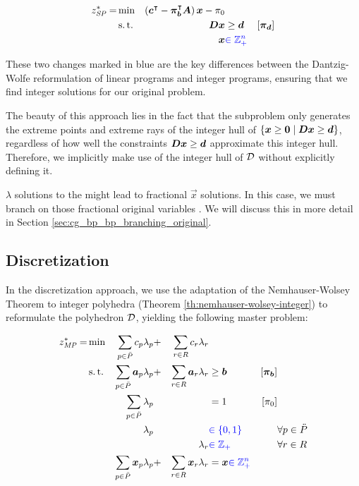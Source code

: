 \begin{equation}
\begin{aligned}
z^*_\SP{} = &\min & \left( \vec{c}\transpose - \vec{\pi}_\vec{b}\transpose \mat{A} \right) \vec{x} - \pi_0 & & \\
&\st & \mat{D} \vec{x} & \geq \vec{d} & \left[\vec{\pi}_\vec{d}\right] \\
&& \vec{x} & {\color{blue} \in \mathbb{Z}_+^n}
\end{aligned}
\end{equation}

These two changes marked in blue are the key differences between the Dantzig-Wolfe reformulation of linear programs and integer programs, ensuring that we find integer solutions for our original problem.

The beauty of this approach lies in the fact that the subproblem only generates the extreme points and extreme rays of the integer hull of $\{{\bm{x}} \geq {\bm{0}} \mid {\bm{D}} {\bm{x}} \geq {\bm{d}}\}$, regardless of how well the constraints ${\bm{D}} {\bm{x}} \geq {\bm{d}}$ approximate this integer hull. Therefore, we implicitly make use of the integer hull of $\mathcal{D}$ without explicitly defining it.

$\lambda$ solutions to the \MP{} might lead to fractional $\vec{x}$ solutions. In this case, we must branch on those fractional original variables \cite{thebook}. We will discuss this in more detail in Section \ref{sec:cg_bp_bp_branching_original}.

\subsection{Discretization}\label{sec:cg_bp_ip_discretization}
In the discretization approach, we use the adaptation of the Nemhauser-Wolsey Theorem to integer polyhedra (Theorem \ref{th:nemhauser-wolsey-integer}) to reformulate the polyhedron $\mathcal{D}$, yielding the following master problem:

\begin{equation}
\begin{aligned}
z^*_{\textit{MP}}{} = &\min & \sum_{p \in \ddot{P}} c_p \lambda_p &+ &\sum_{r \in R} c_r \lambda_r & & & \\
&\operatorname{s.t.} & \sum_{p \in \ddot{P}} {\bm{a}}_p \lambda_p &+ &\sum_{r \in R} {\bm{a}}_r \lambda_r & \geq {\bm{b}} & \left[{\bm{\pi}}_{\bm{b}}\right] \\
&& \sum_{p \in \ddot{P}} \lambda_p & & & = 1 & \left[\pi_0 \right] & \\
&& \lambda_p & & & {\color{blue} \in \{0, 1\}} & & \forall p \in \ddot{P} \\
&& & & \lambda_r & {\color{blue} \in \mathbb{Z}_+} & & \forall r \in R \\
&& \sum_{p \in \ddot{P}} {\bm{x}}_p \lambda_p &+ &\sum_{r \in R} {\bm{x}}_r \lambda_r & = {\bm{x}} {\color{blue} \in \mathbb{Z}_+^n} & &
\end{aligned}
\end{equation}

